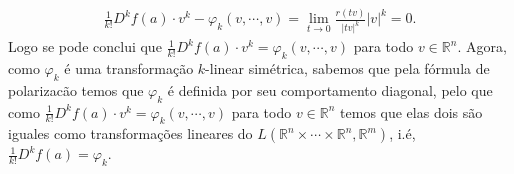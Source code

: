 \begin{homeworkProblem}[Seção 3-8]
\begin{solution}
\begin{itemize}
\begin{align*}
          \frac{1}{k!}D^{k}f(a)\cdot v^{k}- \varphi_{k}(v,\cdots,v)=\lim_{t \to 0}\frac{r(tv)}{|tv|^{k}}|v|^{k}=0.
        \end{align*}
        Logo se pode conclui que $\frac{1}{k!}D^{k}f(a)\cdot v^{k}=\varphi_k(v,\cdots,v)$ para todo $v\in\mathbb{R}^{n}$. Agora, como $\varphi_{k}$ é uma transformação $k$-linear simétrica, sabemos que pela fórmula de polarizacão temos que $\varphi_{k}$ é definida por seu comportamento diagonal, pelo que como $\frac{1}{k!}D^{k}f(a)\cdot v^{k}=\varphi_k(v,\cdots,v)$ para todo $v\in\mathbb{R}^{n}$ temos que elas dois são iguales como transformações lineares do $L(\mathbb{R}^{n}\times\cdots\times\mathbb{R}^{n},\mathbb{R}^{m})$, i.é, $\frac{1}{k!}D^{k}f(a)=\varphi_{k}$. 
    \end{itemize}
  \end{solution}
\end{homeworkProblem}
